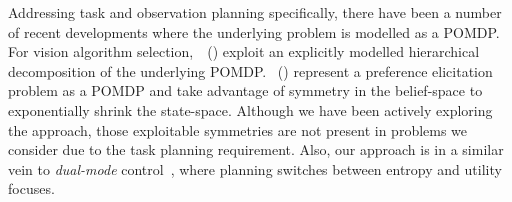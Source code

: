 





Addressing task and observation planning specifically, there have been
a number of recent developments where the underlying problem is
modelled as a POMDP.
For vision algorithm
selection,~\citeauthor{hippo-jnl}~(\citeyear{hippo-jnl}) exploit an
explicitly modelled hierarchical decomposition of the underlying
POMDP. \citeauthor{doshi08:pref_elic}~(\citeyear{doshi08:pref_elic})
represent a preference elicitation problem as a POMDP and take
advantage of symmetry in the belief-space to exponentially shrink the
state-space. Although we have been actively exploring
the \citeauthor{doshi08:pref_elic} approach, those exploitable
symmetries are not present in problems we consider due to the task
planning requirement.
Also, our approach is in a similar vein to {\em dual-mode}
control~\cite{cassandra96actingunder}, where planning switches between
entropy and utility focuses.






